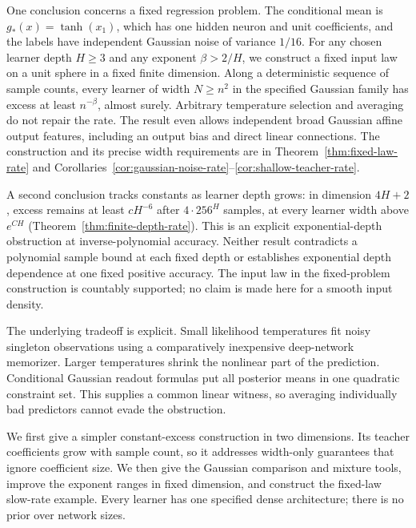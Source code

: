 \documentclass[11pt]{article}
\begin{document}
One conclusion concerns a fixed regression problem. The conditional mean is $g_*(x)=\tanh(x_1)$, which has one hidden neuron and unit coefficients, and the labels have independent Gaussian noise of variance $1/16$. For any chosen learner depth $H\ge3$ and any exponent $\beta>2/H$, we construct a fixed input law on a unit sphere in a fixed finite dimension. Along a deterministic sequence of sample counts, every learner of width $N\ge n^2$ in the specified Gaussian family has excess at least $n^{-\beta}$, almost surely. Arbitrary temperature selection and averaging do not repair the rate. The result even allows independent broad Gaussian affine output features, including an output bias and direct linear connections. The construction and its precise width requirements are in Theorem~\ref{thm:fixed-law-rate} and Corollaries~\ref{cor:gaussian-noise-rate}--\ref{cor:shallow-teacher-rate}.

A second conclusion tracks constants as learner depth grows: in dimension $4H+2$, excess remains at least $cH^{-6}$ after $4\cdot256^H$ samples, at every learner width above $e^{CH}$ (Theorem~\ref{thm:finite-depth-rate}). This is an explicit exponential-depth obstruction at inverse-polynomial accuracy. Neither result contradicts a polynomial sample bound at each fixed depth or establishes exponential depth dependence at one fixed positive accuracy. The input law in the fixed-problem construction is countably supported; no claim is made here for a smooth input density.

The underlying tradeoff is explicit. Small likelihood temperatures fit noisy singleton observations using a comparatively inexpensive deep-network memorizer. Larger temperatures shrink the nonlinear part of the prediction. Conditional Gaussian readout formulas put all posterior means in one quadratic constraint set. This supplies a common linear witness, so averaging individually bad predictors cannot evade the obstruction.

We first give a simpler constant-excess construction in two dimensions. Its teacher coefficients grow with sample count, so it addresses width-only guarantees that ignore coefficient size. We then give the Gaussian comparison and mixture tools, improve the exponent ranges in fixed dimension, and construct the fixed-law slow-rate example. Every learner has one specified dense architecture; there is no prior over network sizes.
\end{document}
